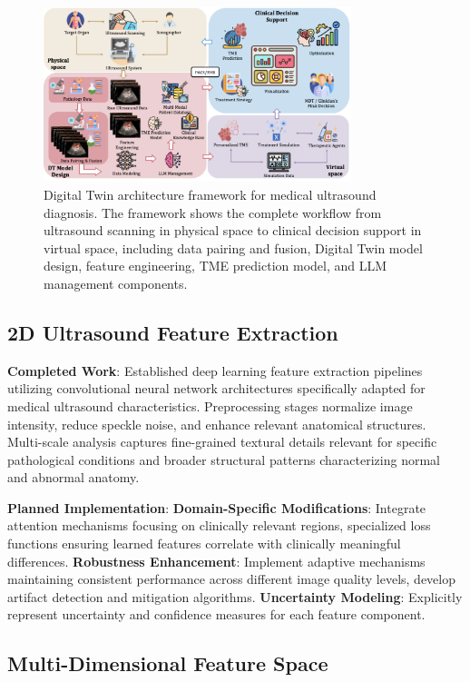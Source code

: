 \begin{figure}[htbp]
\centering
\includegraphics[width=0.8\textwidth]{figures/Med/med_framework.png}
\caption{Digital Twin architecture framework for medical ultrasound diagnosis. The framework shows the complete workflow from ultrasound scanning in physical space to clinical decision support in virtual space, including data pairing and fusion, Digital Twin model design, feature engineering, TME prediction model, and LLM management components.}
\label{fig:med_framework}
\end{figure}

\subsection{2D Ultrasound Feature Extraction}

\textbf{Completed Work}: Established deep learning feature extraction pipelines utilizing convolutional neural network architectures specifically adapted for medical ultrasound characteristics. Preprocessing stages normalize image intensity, reduce speckle noise, and enhance relevant anatomical structures. Multi-scale analysis captures fine-grained textural details relevant for specific pathological conditions and broader structural patterns characterizing normal and abnormal anatomy.

\textbf{Planned Implementation}:
\textbf{Domain-Specific Modifications}: Integrate attention mechanisms focusing on clinically relevant regions, specialized loss functions ensuring learned features correlate with clinically meaningful differences.
\textbf{Robustness Enhancement}: Implement adaptive mechanisms maintaining consistent performance across different image quality levels, develop artifact detection and mitigation algorithms.
\textbf{Uncertainty Modeling}: Explicitly represent uncertainty and confidence measures for each feature component.

\subsection{Multi-Dimensional Feature Space}

